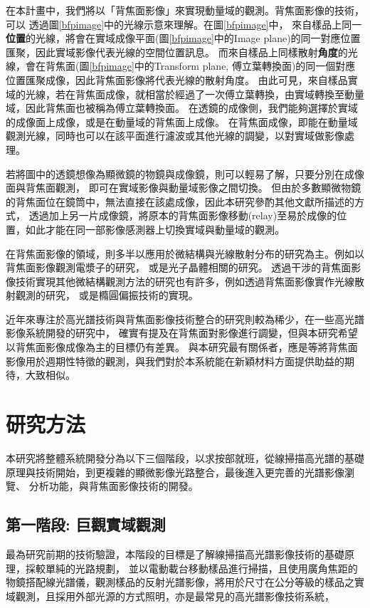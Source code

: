 \documentclass[12pt]{article}
\begin{document}
在本計畫中，我們將以「背焦面影像」來實現動量域的觀測。背焦面影像的技術，可以
透過圖\ref{bfpimage}中的光線示意來理解。在圖\ref{bfpimage}中，
來自樣品上同一\textbf{位置}的光線，將會在實域成像平面(圖\ref{bfpimage}中的Image plane)的同一對應位置匯聚，因此實域影像代表光線的空間位置訊息。
而來自樣品上同樣散射\textbf{角度}的光線，會在背焦面(圖\ref{bfpimage}中的Transform plane, 傅立葉轉換面)的同一個對應位置匯聚成像，因此背焦面影像將代表光線的散射角度。
由此可見，來自樣品實域的光線，若在背焦面成像，就相當於經過了一次傅立葉轉換，由實域轉換至動量域，因此背焦面也被稱為傅立葉轉換面。
在透鏡的成像側，我們能夠選擇於實域的成像面上成像，或是在動量域的背焦面上成像。
在背焦面成像，即能在動量域觀測光線，同時也可以在該平面進行濾波或其他光線的調變，以對實域做影像處理。

若將圖中的透鏡想像為顯微鏡的物鏡與成像鏡，則可以輕易了解，只要分別在成像面與背焦面觀測，
即可在實域影像與動量域影像之間切換。
但由於多數顯微物鏡的背焦面位在鏡筒中，無法直接在該處成像，因此本研究參酌其他文獻\cite{bfpimage}所描述的方式，
透過加上另一片成像鏡，將原本的背焦面影像移動(relay)至易於成像的位置，如此才能在同一部影像感測器上切換實域與動量域的觀測。

在背焦面影像的領域，則多半以應用於微結構與光線散射分布的研究為主。例如以背焦面影像觀測電漿子的研究，
或是光子晶體相關的研究\cite{hartmann2013radiation,zhang2014back,wagner2012back}。
透過干涉的背焦面影像技術實現其他微結構觀測方法的研究也有許多，例如透過背焦面影像實作光線散射觀測的研究\cite{davidson2006interferometric}，
或是橢圓偏振技術的實現\cite{feke1998interferometric}。

近年來專注於高光譜技術與背焦面影像技術整合的研究則較為稀少，在一些高光譜影像系統開發的研究中，
確實有提及在背焦面對影像進行調變\cite{gao2010snapshot}，但與本研究希望以背焦面影像成像為主的目標仍有差異。
與本研究最有關係者，應是\cite{phdthesis}等將背焦面影像用於週期性特徵的觀測，與我們對於本系統能在新穎材料方面提供助益的期待，大致相似。

\section{研究方法}
本研究將整體系統開發分為以下三個階段，以求按部就班，從線掃描高光譜的基礎原理與技術開始，到更複雜的顯微影像光路整合，最後進入更完善的光譜影像瀏覽、
分析功能，與背焦面影像技術的開發。
\subsection{第一階段: 巨觀實域觀測} \label{macroreal}
最為研究前期的技術驗證，本階段的目標是了解線掃描高光譜影像技術的基礎原理，採較單純的光路規劃，
並以電動載台移動樣品進行掃描，且使用廣角焦距的物鏡搭配線光譜儀，觀測樣品的反射光譜影像，將用於尺寸在公分等級的樣品之實域觀測，且採用外部光源的方式照明，亦是最常見的高光譜影像技術系統，
\end{document}
